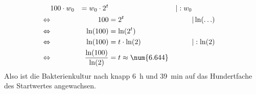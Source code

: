 \begin{exercise}
\begin{enumerate}[a)]
\begin{alignat*}{3}
              &
              100\cdot w_0&=w_0\cdot2^t
              &
              \quad&|:w_0
              \\
              \Leftrightarrow&\quad
              &
              100&=2^t
              &
              \quad&|\ln(\ldots)
              \\
              \Leftrightarrow&\quad
              &
              \ln(100)&=\ln(2^t)
              &
              \quad&\relax
              \\
              \Leftrightarrow&\quad
              &
              \ln(100)&=t\cdot\ln(2)
              &
              \quad&|:\ln(2)
              \\
              \Leftrightarrow&\quad
              &
              \frac{\ln(100)}{\ln(2)}&=t\approx\num{6.644}
              &
              \quad&\relax
            \end{alignat*}
            Also ist die Bakterienkultur nach knapp
            \SI{6}{\hour} und \SI{39}{\minute}
            auf das Hundertfache des
            Startwertes angewachsen.
    \end{enumerate}
  \fi
\end{exercise}
